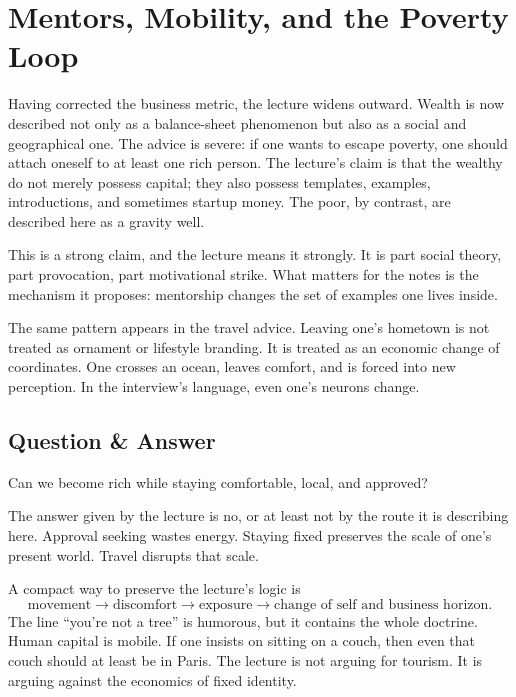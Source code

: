 \section{Mentors, Mobility, and the Poverty Loop}

Having corrected the business metric, the lecture widens outward. Wealth is now described not only as a balance-sheet phenomenon but also as a social and geographical one. The advice is severe: if one wants to escape poverty, one should attach oneself to at least one rich person. The lecture's claim is that the wealthy do not merely possess capital; they also possess templates, examples, introductions, and sometimes startup money. The poor, by contrast, are described here as a gravity well.

This is a strong claim, and the lecture means it strongly. It is part social theory, part provocation, part motivational strike. What matters for the notes is the mechanism it proposes: mentorship changes the set of examples one lives inside.

The same pattern appears in the travel advice. Leaving one's hometown is not treated as ornament or lifestyle branding. It is treated as an economic change of coordinates. One crosses an ocean, leaves comfort, and is forced into new perception. In the interview's language, even one's neurons change.

\subsection{Question \& Answer}

Can we become rich while staying comfortable, local, and approved?

The answer given by the lecture is no, or at least not by the route it is describing here. Approval seeking wastes energy. Staying fixed preserves the scale of one's present world. Travel disrupts that scale.

A compact way to preserve the lecture's logic is
\begin{equation}
\text{movement} \to \text{discomfort} \to \text{exposure} \to \text{change of self and business horizon}.
\end{equation}
The line ``you're not a tree'' is humorous, but it contains the whole doctrine. Human capital is mobile. If one insists on sitting on a couch, then even that couch should at least be in Paris. The lecture is not arguing for tourism. It is arguing against the economics of fixed identity.

